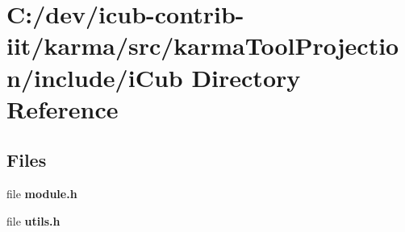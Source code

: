 \section{C\+:/dev/icub-\/contrib-\/iit/karma/src/karma\+Tool\+Projection/include/i\+Cub Directory Reference}
\label{dir_2c4c692e0e93e67fe6dacb9253ee9a1d}
\subsection*{Files}
\begin{DoxyCompactItemize}
\item 
file {\bfseries module.\+h}
\item 
file {\bfseries utils.\+h}
\end{DoxyCompactItemize}

